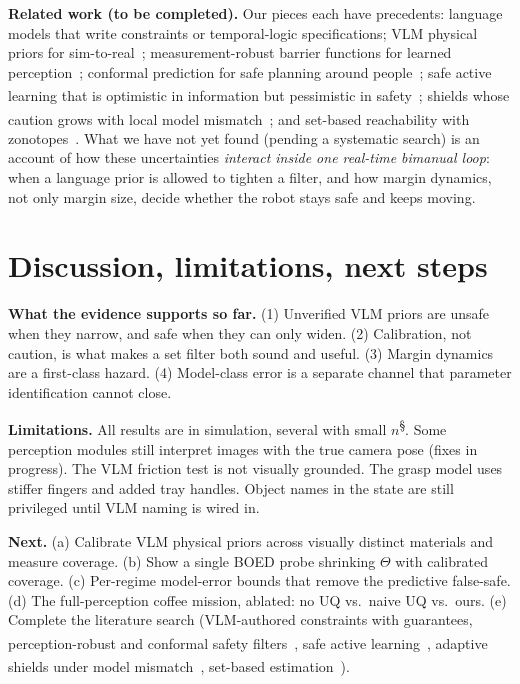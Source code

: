 \documentclass[10pt,twocolumn,letterpaper]{article}
\newcommand{\tv}{\textsuperscript{\dag}}  %
\newcommand{\pre}{\textsuperscript{\S}}   %
\begin{document}
\textbf{Related work (to be completed).} Our pieces each have precedents: language models that write constraints or temporal-logic
specifications; VLM physical priors for sim-to-real~\cite{phys2real}; measurement-robust barrier functions for learned
perception~\cite{dean2020}; conformal prediction for safe planning around people~\cite{lindemann2023}; safe active learning that is
optimistic in information but pessimistic in safety~\cite{actsafe}\tv; shields whose caution grows with local model
mismatch~\cite{luchen}\tv; and set-based reachability with zonotopes~\cite{girard2005,althoff2015,scott2016}. What we have not yet found
(pending a systematic search) is an account of how these uncertainties \emph{interact inside one real-time bimanual loop}: when a
language prior is allowed to tighten a filter, and how margin dynamics, not only margin size, decide whether the robot stays safe and keeps moving.

\section{Discussion, limitations, next steps}
\textbf{What the evidence supports so far.} (1) Unverified VLM priors are unsafe when they narrow, and safe when they can only widen.
(2) Calibration, not caution, is what makes a set filter both sound and useful. (3) Margin dynamics are a first-class hazard. (4) Model-class
error is a separate channel that parameter identification cannot close.

\textbf{Limitations.} All results are in simulation, several with small $n$\pre. Some perception modules still interpret images with the
true camera pose (fixes in progress). The VLM friction test is not visually grounded. The grasp model uses stiffer fingers and added tray
handles. Object names in the state are still privileged until VLM naming is wired in.

\textbf{Next.} (a) Calibrate VLM physical priors across visually distinct materials and measure coverage. (b) Show a single BOED probe
shrinking $\Theta$ with calibrated coverage. (c) Per-regime model-error bounds that remove the predictive false-safe. (d) The full-perception
coffee mission, ablated: no UQ vs.\ naive UQ vs.\ ours. (e) Complete the literature search (VLM-authored constraints with guarantees,
perception-robust and conformal safety filters~\cite{dean2020,lindemann2023}, safe active learning~\cite{actsafe}\tv, adaptive shields
under model mismatch~\cite{luchen}\tv, set-based estimation~\cite{scott2016}).
\end{document}
